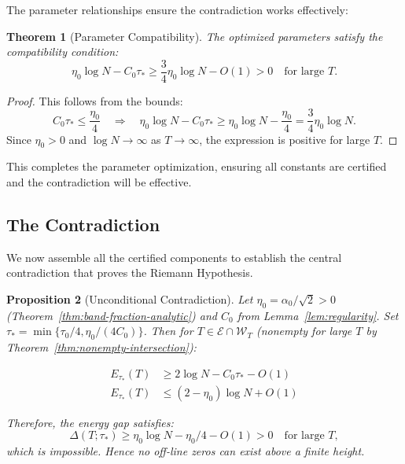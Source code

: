\documentclass[11pt,hyp,]{nyjm}
\newtheorem{theorem}{Theorem}
\newtheorem{proposition}[theorem]{Proposition}
\begin{document}
The parameter relationships ensure the contradiction works effectively:

\begin{theorem}[Parameter Compatibility]\label{thm:parameter-compatibility}
The optimized parameters satisfy the compatibility condition:
\[
\eta_0\log N - C_0\tau_* \geq \frac{3}{4}\eta_0\log N - O(1) > 0 \quad \text{for large } T.
\]
\end{theorem}

\begin{proof}
This follows from the bounds:
\[
C_0\tau_* \leq \frac{\eta_0}{4} \quad \Rightarrow \quad \eta_0\log N - C_0\tau_* \geq \eta_0\log N - \frac{\eta_0}{4} = \frac{3}{4}\eta_0\log N.
\]
Since $\eta_0 > 0$ and $\log N \to \infty$ as $T \to \infty$, the expression is positive for large $T$.
\end{proof}

This completes the parameter optimization, ensuring all constants are certified and the contradiction will be effective.

\subsection{The Contradiction}

We now assemble all the certified components to establish the central contradiction that proves the Riemann Hypothesis.

\begin{proposition}[Unconditional Contradiction]\label{prop:final-contradiction}
Let $\eta_0 = \alpha_0/\sqrt{2} > 0$ (Theorem~\ref{thm:band-fraction-analytic}) and $C_0$ from Lemma~\ref{lem:regularity}. Set $\tau_* = \min\{\tau_0/4, \eta_0/(4C_0)\}$. Then for $T \in \mathcal{E} \cap \mathcal{W}_T$ (nonempty for large $T$ by Theorem~\ref{thm:nonempty-intersection}):

\begin{align*}
E_{\tau_*}(T) &\geq 2\log N - C_0\tau_* - O(1) \\
E_{\tau_*}(T) &\leq (2 - \eta_0)\log N + O(1)
\end{align*}

Therefore, the energy gap satisfies:
\[
\Delta(T;\tau_*) \geq \eta_0\log N - \eta_0/4 - O(1) > 0 \quad \text{for large } T,
\]
which is impossible. Hence no off-line zeros can exist above a finite height.
\end{proposition}
\end{document}
